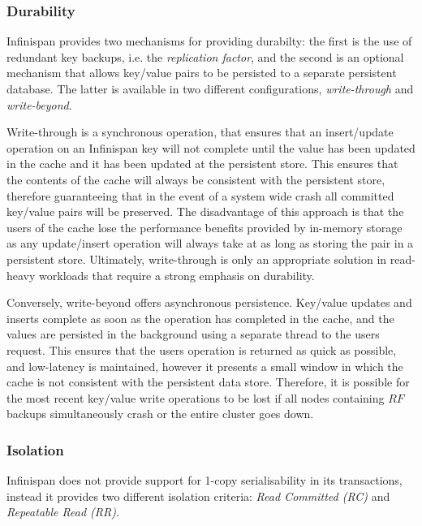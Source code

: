 		    \subsubsection*{Durability}
		    Infinispan provides two mechanisms for providing durabilty: the first is the use of redundant key backups, i.e. the \emph{replication factor}, and the second is an optional mechanism that allows key/value pairs to be persisted to a separate persistent database.  The latter is available in two different configurations, \emph{write-through} and \emph{write-beyond}. 
		    
		    Write-through is a synchronous operation, that ensures that an insert/update operation on an Infinispan key will not complete until the value has been updated in the cache and it has been updated at the persistent store.  This ensures that the contents of the cache will always be consistent with the persistent store, therefore guaranteeing that in the event of a system wide crash all committed key/value pairs will be preserved.  The disadvantage of this approach is that the users of the cache lose the performance benefits provided by in-memory storage as any update/insert operation will always take at as long as storing the pair in a persistent store.  Ultimately, write-through is only an appropriate solution in read-heavy workloads that require a strong emphasis on durability.  
		    
		    Conversely, write-beyond offers asynchronous persistence.  Key/value updates and inserts complete as soon as the operation has completed in the cache, and the values are persisted in the background using a separate thread to the users request.  This ensures that the users operation is returned as quick as possible, and low-latency is maintained, however it presents a small window in which the cache is not consistent with the persistent data store.  Therefore, it is possible for the most recent key/value write operations to be lost if all nodes containing $RF$ backups simultaneously crash or the entire cluster goes down.  
    
	        \subsubsection*{Isolation}\label{ssec:infi_isolation}
	        Infinispan does not provide support for 1-copy serialisability in its transactions, instead it provides two different isolation criteria: \emph{Read Committed (RC)} and \emph{Repeatable Read (RR)}.  
	        
